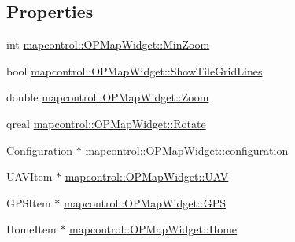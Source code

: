 \subsection*{\-Properties}
\begin{DoxyCompactItemize}
\item 
int \hyperlink{group___o_p_map_widget_gac91f92751a3ac3a5a10a6592d4213d42}{mapcontrol\-::\-O\-P\-Map\-Widget\-::\-Min\-Zoom}
\item 
bool \hyperlink{group___o_p_map_widget_ga41a15a2c8198b2ad76d2b494917a02ed}{mapcontrol\-::\-O\-P\-Map\-Widget\-::\-Show\-Tile\-Grid\-Lines}
\item 
double \hyperlink{group___o_p_map_widget_gadc46820d44c2517e9a6014ddede98099}{mapcontrol\-::\-O\-P\-Map\-Widget\-::\-Zoom}
\item 
qreal \hyperlink{group___o_p_map_widget_gac0960d6e34ea06d84ddad72f930a3917}{mapcontrol\-::\-O\-P\-Map\-Widget\-::\-Rotate}
\item 
\-Configuration $\ast$ \hyperlink{group___o_p_map_widget_gaa79e123990d6d7b2f1c45e5c2a56313d}{mapcontrol\-::\-O\-P\-Map\-Widget\-::configuration}
\item 
\-U\-A\-V\-Item $\ast$ \hyperlink{group___o_p_map_widget_gabb5c6c7e07970a7f9b774ebf94cd2286}{mapcontrol\-::\-O\-P\-Map\-Widget\-::\-U\-A\-V}
\item 
\-G\-P\-S\-Item $\ast$ \hyperlink{group___o_p_map_widget_ga83798c623babeffb173d483ad1c84ccc}{mapcontrol\-::\-O\-P\-Map\-Widget\-::\-G\-P\-S}
\item 
\-Home\-Item $\ast$ \hyperlink{group___o_p_map_widget_ga3c39e182c87b25990664fbe7dd0a9eff}{mapcontrol\-::\-O\-P\-Map\-Widget\-::\-Home}
\end{DoxyCompactItemize}
